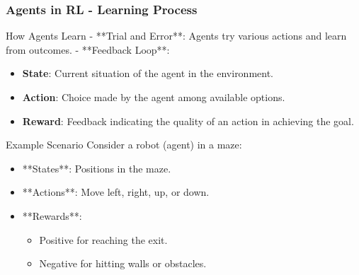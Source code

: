 \documentclass{beamer}
\begin{document}
\begin{frame}[fragile]
    \frametitle{Agents in RL - Learning Process}
    \begin{block}{How Agents Learn}
        - **Trial and Error**: Agents try various actions and learn from outcomes.
        - **Feedback Loop**:
        \begin{itemize}
            \item \textbf{State}: Current situation of the agent in the environment.
            \item \textbf{Action}: Choice made by the agent among available options.
            \item \textbf{Reward}: Feedback indicating the quality of an action in achieving the goal.
        \end{itemize}
    \end{block}
    
    \begin{block}{Example Scenario}
        Consider a robot (agent) in a maze:
        \begin{itemize}
            \item **States**: Positions in the maze.
            \item **Actions**: Move left, right, up, or down.
            \item **Rewards**:
            \begin{itemize}
                \item Positive for reaching the exit.
                \item Negative for hitting walls or obstacles.
            \end{itemize}
        \end{itemize}
    \end{block}
\end{frame}
\end{document}
